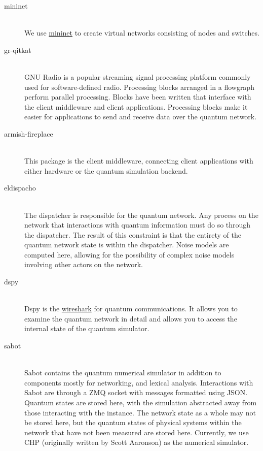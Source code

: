 \documentclass[letterpaper,twoside=false]{scrbook}
\begin{document}
	\begin{description}
		\item[mininet] \hfill \\
		We use \href{www.mininet.org}{mininet} to create virtual networks consisting of nodes and switches.
		
		\item[gr-qitkat] \hfill \\
		GNU Radio is a popular streaming signal processing platform commonly used for software-defined radio. Processing blocks arranged in a flowgraph perform parallel processing. Blocks have been written that interface with the client middleware and client applications. Processing blocks make it easier for applications to send and receive data over the quantum network.
		
		\item[armish-fireplace] \hfill \\
		This package is the client middleware, connecting client applications with either hardware or the quantum simulation backend. 
		
		\item[eldispacho] \hfill \\
		The dispatcher is responsible for the quantum network. Any process on the network that interactions with quantum information must do so through the dispatcher. The result of this constraint is that the entirety of the quantum network state is within the dispatcher. Noise models are computed here, allowing for the possibility of complex noise models involving other actors on the network.
		
		\item[dspy] \hfill \\
		Dspy is the \href{www.wireshark.org}{wireshark} for quantum communications. It allows you to examine the quantum network in detail and allows you to access the internal state of the quantum simulator.
		
		\item[sabot] \hfill \\
		Sabot contains the quantum numerical simulator in addition to components mostly for networking, and lexical analysis. Interactions with Sabot are through a ZMQ socket with messages formatted using JSON. Quantum states are stored here, with the simulation abstracted away from those interacting with the instance. The network state as a whole may not be stored here, but the quantum states of physical systems within the network that have not been measured are stored here. Currently, we use CHP (originally written by Scott Aaronson) as the numerical simulator.
		
	\end{description}
	
\end{document}
